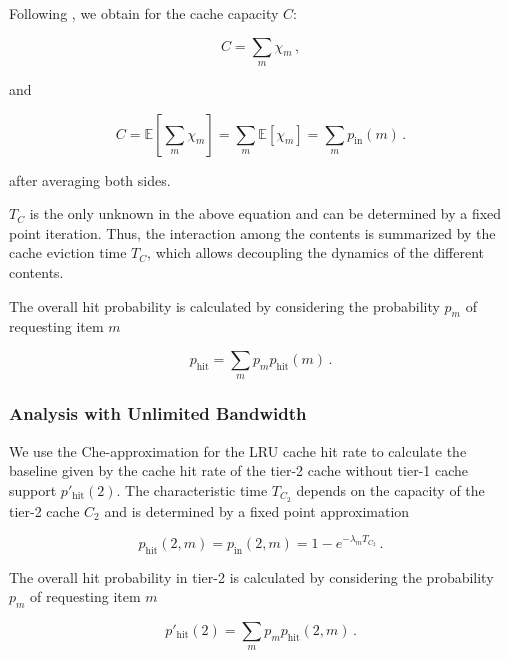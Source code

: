 Following \cite{martina2014unified}, we obtain for the cache capacity $C$:

\begin{equation}
	C=\sum_m{\chi_m} \, ,
\end{equation}

and

\begin{equation}
	C=\mathbb{E}\left[\sum_m{\chi_m}\right]=\sum_m{\mathbb{E}\left[\chi_m\right]}=\sum_m{p_\text{in}(m)} \, .
\end{equation}

after averaging both sides.

$T_C$ is the only unknown in the above equation and can be determined by a fixed point iteration.
Thus, the interaction among the contents is summarized by the cache eviction time $T_C$, which allows decoupling the dynamics of the different contents.

The overall hit probability is calculated by considering the probability $p_m$ of requesting item $m$

\begin{equation}
p_\text{hit}=\sum_m p_m p_\text{hit}(m) \, .
\end{equation}

\subsubsection{Analysis with Unlimited Bandwidth}

We use the Che-approximation for the LRU cache hit rate to calculate the baseline given by the cache hit rate of the tier-2 cache without tier-1 cache support $p'_\text{hit}(2)$.
The characteristic time $T_{C_2}$ depends on the capacity of the tier-2 cache $C_2$ and is determined by a fixed point approximation

\begin{equation}
p_\text{hit}(2,m)=p_\text{in}(2,m)=1-e^{-\lambda_{m}T_{C_2}} \, .
\end{equation}

The overall hit probability in tier-2 is calculated by considering the probability $p_m$ of requesting item $m$

\begin{equation}
p'_\text{hit}(2)=\sum_m p_m p_\text{hit}(2,m) \, .
\end{equation}


